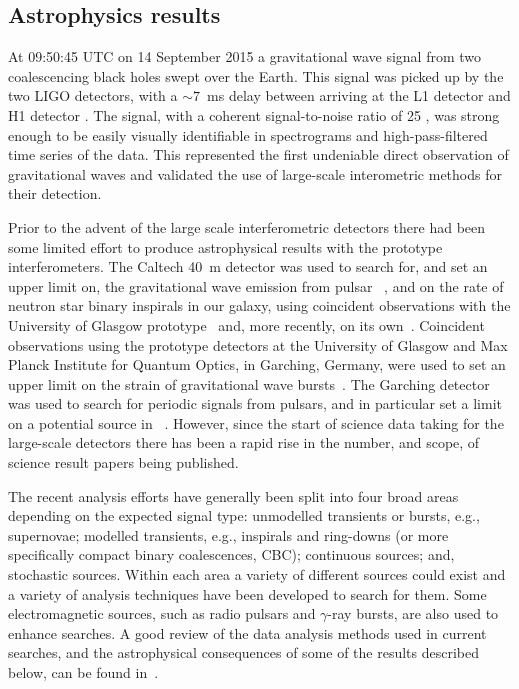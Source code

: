 \subsection{Astrophysics results}
\label{subsection:results}

At 09:50:45 UTC on 14 September 2015 a gravitational wave signal from two coalescencing black holes swept 
over the Earth. This signal was picked up by the two LIGO detectors, with a $\sim 7$~ms delay between 
arriving at the L1 detector and H1 detector \cite{GW150914}. The signal, with a coherent signal-to-noise 
ratio of 25 \cite{2016PhRvL.116x1102A}, was strong enough to be easily visually identifiable in spectrograms 
and high-pass-filtered time series of the data. This represented the first undeniable direct observation of 
gravitational waves and validated the use of large-scale interometric methods for their detection.

Prior to the advent of the large scale interferometric detectors there had been some limited effort to 
produce astrophysical results with the prototype interferometers. The Caltech 40~m detector was used to 
search for, and set an upper limit on, the gravitational wave emission from pulsar
~\cite{Hereld:1984}, and on the rate of neutron star binary inspirals in our 
galaxy, using coincident observations with the University of Glasgow prototype~\cite{Smith:1988} and, more 
recently, on its own~\cite{Allen:1999}. Coincident observations using the prototype detectors at the 
University of Glasgow and Max Planck Institute for Quantum Optics, in Garching, Germany, were used to set
an upper limit on the strain of gravitational wave bursts~\cite{Nicholson:1996}. The Garching detector was 
used to search for periodic signals from pulsars, and in particular set a limit on a potential source in
~\cite{Niebauer:1993}. However, since the start of science data taking for the 
large-scale detectors there has been a rapid rise in the number, and scope, of science result papers being
published.

The recent analysis efforts have generally been split into four broad areas depending on the expected signal 
type: unmodelled transients or bursts, e.g., supernovae; modelled transients, e.g., inspirals and ring-downs 
(or more specifically compact binary coalescences, CBC); continuous sources; and, stochastic sources. Within 
each area a variety of different sources could exist and a variety of analysis techniques have been developed 
to search for them. Some electromagnetic sources, such as radio pulsars and $\gamma$-ray bursts, are also
used to enhance searches. A good review of the data analysis methods used in current searches, and the 
astrophysical consequences of some of the results described below, can be found in~\cite{Sathyaprakash:2009}.

